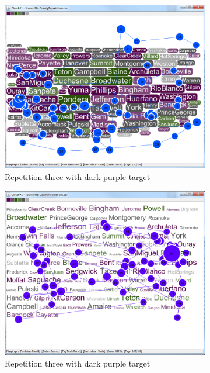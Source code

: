 \begin{figure}[!htb]
\centering
\begin{subfigure}{.5\textwidth}
  \centering
  \includegraphics[scale=0.25]{combsearchgazetrial3bgsp.png}
  \caption{Repetition three with dark purple target}
\end{subfigure}%
\begin{subfigure}{.5\textwidth}
  \centering
  \includegraphics[scale=0.25]{combsearchgazetrial3fgty.png}
  \caption{Repetition three with dark purple target}
\end{subfigure}
\begin{subfigure}{.5\textwidth}

\end{subfigure}
\end{figure}
